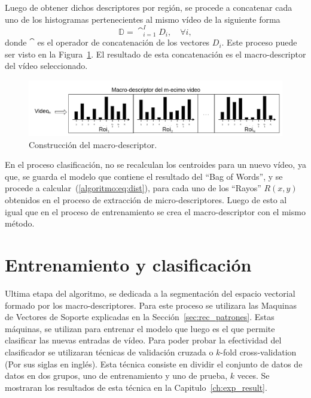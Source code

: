 	
	Luego de obtener dichos descriptores por región, se procede a concatenar cada uno de los histogramas pertenecientes al mismo vídeo de la siguiente forma
	\begin{equation}
		\mathds{D} = \cat_{i = 1}^{I} D_i, \quad \forall i,
	\end{equation}	   
   donde $\cat$ es el operador de concatenación de los vectores $D_i$. Este proceso puede ser visto en la Figura~\ref{algoritmo:fig:macro-descriptores}. El resultado de esta concatenación es el macro-descriptor del vídeo seleccionado.
   
	\begin{figure}[bt]
		\centering
  		\label{algoritmo:fig:macro-descriptores}
    		\includegraphics[width=1\textwidth]{Figuras/Diagramas/macro-descriptor.png}
  		\caption{Construcción del macro-descriptor.}
	\end{figure}	

	En el proceso clasificación, no se recalculan los centroides para un nuevo vídeo, ya que, se guarda el modelo que contiene el resultado del ``Bag of Words'', y se procede a calcular~(\ref{algoritmo:eq:dist}), para cada uno de los ``Rayos'' $R(x,y)$ obtenidos en el proceso de extracción de micro-descriptores. Luego de esto al igual que en el proceso de entrenamiento se crea el macro-descriptor con el mismo método.
	
	
\section{Entrenamiento y clasificación}
\label{sec:clasificacion}
Ultima etapa del algoritmo, se dedicada a la segmentación del espacio vectorial formado por los macro-descriptores. Para este proceso se utilizara las Maquinas de Vectores de Soporte explicadas en la Sección~\ref{sec:rec_patrones}. Estas máquinas, se utilizan para entrenar el modelo que luego es el que permite clasificar las nuevas entradas de vídeo. 
Para poder probar la efectividad del clasificador se utilizaran técnicas de validación cruzada o $k$-fold cross-validation (Por sus siglas en inglés). Esta técnica consiste en dividir el conjunto de datos de datos en dos grupos, uno de entrenamiento y uno de prueba, $k$ veces. Se mostraran los resultados de esta técnica en la Capitulo~\ref{ch:exp_result}.


